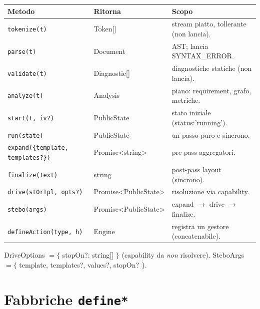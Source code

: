 \documentclass[11pt,a4paper]{book}
\let\code\lstinline
\newcommand{\ic}[1]{{\ttfamily #1}}
\theoremstyle{definition}
\begin{document}
{{{{\begin{center}
\small
\begin{tabular}{@{}l l p{6.6cm}@{}}
\toprule
\textbf{Metodo} & \textbf{Ritorna} & \textbf{Scopo} \\
\midrule
\code|tokenize(t)| & \ic{Token[]} & stream piatto, tollerante (non lancia). \\
\code|parse(t)| & \ic{Document} & AST; lancia \ic{SYNTAX\_ERROR}. \\
\code|validate(t)| & \ic{Diagnostic[]} & diagnostiche statiche (non lancia). \\
\code|analyze(t)| & \ic{Analysis} & piano: requirement, grafo, metriche. \\
\code|start(t, iv?)| & \ic{PublicState} & stato iniziale (\ic{status:'running'}). \\
\code|run(state)| & \ic{PublicState} & un passo puro e sincrono. \\
\code|expand({template, templates?})| & \ic{Promise<string>} & pre-pass aggregatori. \\
\code|finalize(text)| & \ic{string} & post-pass layout (sincrono). \\
\code|drive(stOrTpl, opts?)| & \ic{Promise<PublicState>} & risoluzione via capability. \\
\code|stebo(args)| & \ic{Promise<PublicState>} & expand $\rightarrow$ drive $\rightarrow$ finalize. \\
\code|defineAction(type, h)| & \ic{Engine} & registra un gestore (concatenabile). \\
\bottomrule
\end{tabular}
\end{center}

\ic{DriveOptions} $= \{$ \ic{stopOn?: string[]} $\}$ (capability da \emph{non}
risolvere). \ic{SteboArgs} $= \{$ \ic{template}, \ic{templates?}, \ic{values?},
\ic{stopOn?} $\}$.

\section{Fabbriche \texttt{define*}}

}}}}
\end{document}
